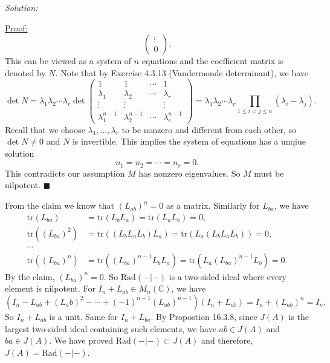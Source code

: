 \documentclass[a4paper, 12pt]{article}
\newenvironment{solution}
    {\textit{Solution:}}
    {}
\newenvironment{claimproof}[1]{\par\noindent\underline{Proof:}\space#1}{\hfill $\blacksquare$}
\newcommand{\tr}{\text{tr}}
\newcommand{\Rad}{\text{Rad}}
\begin{document}
\begin{solution}
\begin{enumerate}[(1)]
\begin{claimproof}
\[\begin{pmatrix}
    \vdots\\ 
    0
\end{pmatrix}.\]
This can be viewed as a system of \(n\) equations and the coefficient matrix is denoted by \(N\). Note that by Exercise 4.3.13 (Vandermonde determinant), we have 
\[\det N=\lambda_1\lambda_2\cdots\lambda_r\det \begin{pmatrix}
    1&1&\cdots&1\\ 
    \lambda_1&\lambda_2&\cdots &\lambda_r\\ 
    \vdots&\vdots&&\vdots\\ 
    \lambda_1^{n-1}&\lambda_2^{n-1}&\cdots&\lambda_r^{n-1}
\end{pmatrix}=\lambda_1\lambda_2\cdots\lambda_r\prod_{1\leq i<j\leq n}(\lambda_i-\lambda_j).\]
Recall that we choose \(\lambda_1,\ldots,\lambda_r\) to be nonzero and different from each other, so \(\det N\neq 0\) and \(N\) is invertible. This implies the system of equations has a unqiue solution 
\[n_1=n_2=\cdots=n_r=0.\]
This contradicts our assumption \(M\) has nonzero eigenvalues. So \(M\) must be nilpotent. 
\end{claimproof}

From the claim we know that \((L_{ab})^n=0\) as a matrix. Similarly for \(L_{ba}\), we have 
\begin{align*}
\tr(L_{ba})&=\tr(L_bL_a)=\tr(L_aL_b)=0,\\ 
\tr((L_{ba})^2)&=\tr((L_bL_aL_b)L_a)=\tr(L_a(L_bL_aL_b))=0,\\ 
\cdots\\ 
\tr((L_{ba})^n)&=\tr((L_{ba})^{n-1}L_bL_a)=\tr(L_a(L_{ba})^{n-1}L_b)=0.
\end{align*} 
By the claim, \((L_{ba})^n=0\). So \(\Rad(-|-)\) is a two-sided ideal where every element is nilpotent. For \(I_n+L_{ab}\in M_n(\mathbb{C})\), we have 
\[(I_n-L_{ab}+(L_ab)^2-\cdots+(-1)^{n-1}(L_{ab})^{n-1})(I_n+L_{ab})=I_n+(L_{ab})^n=I_n.\]
So \(I_n+L_{ab}\) is a unit. Same for \(I_n+L_{ba}\). By Propostion 16.3.8, since \(J(A)\) is the largest two-sided ideal containing such elements, we have \(ab\in J(A)\) and \(ba\in J(A)\). We have 
proved \(\Rad(-|-)\subset J(A)\) and therefore, \(J(A)=\Rad(-|-)\).
\end{enumerate}
\end{solution}
\end{document}
